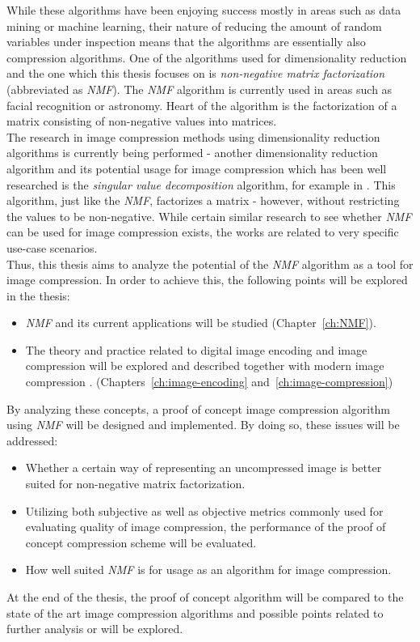 \documentclass[thesis=M,english]{FITthesis}[2012/10/20]
\begin{document}
While these algorithms have been enjoying success mostly in areas such as data mining or machine
learning, their nature of reducing the amount of random variables under inspection means that the
algorithms are essentially also compression algorithms. One of the algorithms used for dimensionality
reduction and the one which this thesis focuses on is \emph{non-negative matrix factorization} (abbreviated
as \emph{NMF}). The \emph{NMF} algorithm is currently used in areas such as facial recognition or
astronomy. Heart of the algorithm is the factorization of a matrix consisting of non-negative values into
matrices.
\\

The research in image compression methods using dimensionality reduction algorithms is currently being
performed - another dimensionality reduction algorithm and its potential usage for image compression 
which has been well researched is the \emph{singular value decomposition} algorithm, for example in \cite{svd-compression}. This algorithm, just like the \emph{NMF}, factorizes a matrix - however, without
restricting the values to be non-negative. While certain similar research to see whether
\emph{NMF} can be used for image compression exists, the works are related to very
specific use-case scenarios.
\\

Thus, this thesis aims to analyze the potential of the \emph{NMF} algorithm
as a tool for image compression. In order to achieve this, the following points
will be explored in the thesis:
\begin{itemize}
  \item \emph{NMF} and its current applications will be studied (Chapter~\ref{ch:NMF}).
  \item The theory and practice related to digital image encoding and image
        compression will be explored and described together with
        modern image compression . (Chapters~\ref{ch:image-encoding} and~\ref{ch:image-compression})
\end{itemize}

By analyzing these concepts, a proof of concept image compression algorithm using
\emph{NMF} will be designed and implemented. By doing so, these issues will be
addressed:
\begin{itemize}
  \item Whether a certain way of representing an uncompressed image is better
        suited for non-negative matrix factorization.
  \item Utilizing both subjective as well as objective metrics commonly used
        for evaluating quality of image compression, the performance of
        the proof of concept compression scheme will be evaluated.
  \item How well suited \emph{NMF} is for usage as an algorithm for image
        compression.
\end{itemize} 
At the end of the thesis, the proof of concept algorithm will be compared to
the state of the art image compression algorithms and possible points related
to further analysis or will be explored.
\\
\end{document}
